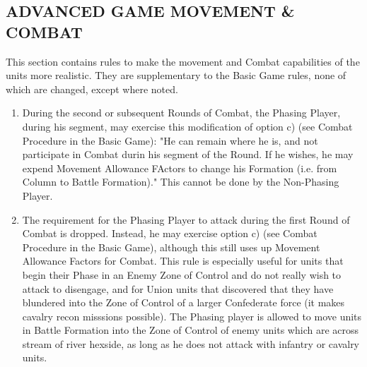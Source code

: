 \subsection{ADVANCED GAME MOVEMENT \& COMBAT}

This section contains rules to make the movement and Combat capabilities of the units more realistic. They are supplementary to the Basic Game rules, none of which are changed, except where noted.

\begin{enumerate}
  \item During the second or subsequent Rounds of Combat, the Phasing Player, during his segment, may exercise this modification of option c) (see Combat Procedure in the Basic Game): "He can remain where he is, and not participate in Combat durin his segment of the Round. If he wishes, he may expend Movement Allowance FActors to change his Formation (i.e. from Column to Battle Formation)." This cannot be done by the Non-Phasing Player.

  \item The requirement for the Phasing Player to attack during the first Round of Combat is dropped. Instead, he may exercise option c) (see Combat Procedure in the Basic Game), although this still uses up Movement Allowance Factors for Combat. This rule is especially useful for units that begin their Phase in an Enemy Zone of Control and do not really wish to attack to disengage, and for Union units that discovered that they have blundered into the Zone of Control of a larger Confederate force (it makes cavalry recon misssions possible). The Phasing player is allowed to move units in Battle Formation into the Zone of Control of enemy units which are across stream of river hexside, as long as he does not attack with infantry or cavalry units.
\end{enumerate}
